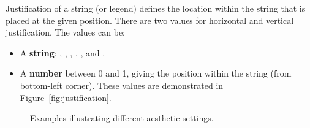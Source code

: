 Justification of a string (or legend) defines the location within the string that is placed at the given position.  There are two values for horizontal and vertical justification.  The values can be:

\begin{itemize}
  \item A {\bf string}: , , , , , and .
  
  \item A {\bf number} between 0 and 1, giving the position within the string (from bottom-left corner).  These values are demonstrated in Figure~\ref{fig:justification}.
\end{itemize}

\begin{figure}[htbp]
  \centering
  \caption{Examples illustrating different aesthetic settings.}
\end{figure}


